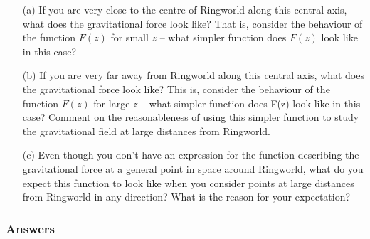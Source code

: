 \documentclass{exam}
\begin{document}
\begin{questions}
\begin{enumerate}
\item[(a)] If you are very close to the centre of Ringworld along this central axis, what does the gravitational force look like?  That is, consider the behaviour of the function $F(z)$ for small $z$ -- what simpler function does $F(z)$ look like in this case? 

\item[(b)] If you are very far away from Ringworld along this central axis, what does the gravitational force look like? This is, consider the behaviour of the function $F(z)$ for large $z$ -- what simpler function does F(z) look like in this case?  Comment on the reasonableness of using this simpler function to study the gravitational field at large distances from Ringworld.

\item[(c)] Even though you don't have an expression for the function describing the gravitational force at a general point in space around Ringworld, what do you expect this function to look like when you consider points at large distances from Ringworld in any direction?  What is the reason for your expectation?

\end{enumerate}


\color{blue}
\subsubsection*{Answers}
\end{questions}
\end{document}

